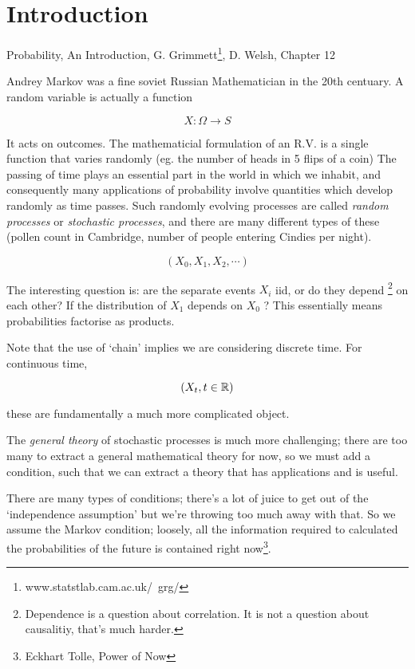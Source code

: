 \documentclass[a4paper]{article}
\begin{document}
\maketitle

\setcounter{section}{-1}
\section{Introduction}


Probability, An Introduction, G. Grimmett\footnote{www.statstlab.cam.ac.uk/~grg/}, D. Welsh, Chapter 12



Andrey Markov was a fine soviet Russian Mathematician in the 20th centuary. 
A random variable is actually a function

\[ X : \Omega \to S  \]

It acts on outcomes. The mathematicial formulation of an R.V. is a single function that varies randomly (eg. the number of heads in 5 flips of a coin)
The passing of time plays an essential part in the world in which we inhabit, and consequently many applications of probability involve quantities which develop randomly as time passes. Such randomly evolving processes are called \emph{random processes} or \emph{stochastic processes}, and there are many different types of these (pollen count in Cambridge, number of people entering Cindies per night).

\[ (X_{0},X_{1},X_{2},\cdots) \]


The interesting question is: are the separate events $ X_{i} $ iid, or do they depend \footnote{Dependence is a question about correlation. It is not a question about causalitiy, that's much harder.} on each other? If the distribution of $ X_{1} $ depends on $ X_{0} $ ? This essentially means probabilities factorise as products.  



Note that the use of `chain' implies we are considering discrete time. For continuous time,

\[ (X_{t}, t \in \mathbb{R}) \]

these are fundamentally a much more complicated object.


The \emph{general theory} of stochastic processes is much more challenging; there are too many to extract a general mathematical theory for now, so we must add a condition, such that we can extract a theory that has applications and is useful. 

There are many types of conditions; there's a lot of juice to get out of the `independence assumption' but we're throwing too much away with that. So we assume the Markov condition; loosely, all the information required to calculated the probabilities of the future is contained right now\footnote{Eckhart Tolle, Power of Now}.
\end{document}

